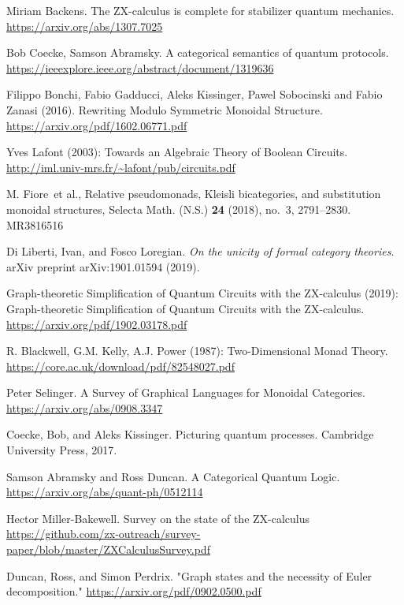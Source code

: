 \documentclass{amsart}
\begin{document}
\begin{thebibliography}{99}

 Miriam Backens. The ZX-calculus is complete for stabilizer quantum mechanics. \url{https://arxiv.org/abs/1307.7025}

 Bob Coecke, Samson Abramsky. A categorical
  semantics of quantum protocols. \url{https://ieeexplore.ieee.org/abstract/document/1319636}

 Filippo Bonchi, Fabio Gadducci, Aleks
  Kissinger, Pawel Sobocinski and Fabio Zanasi (2016). Rewriting
  Modulo Symmetric Monoidal Structure.
  \url{https://arxiv.org/pdf/1602.06771.pdf}

 Yves Lafont (2003): Towards an
  Algebraic Theory of Boolean Circuits.
  \url{http://iml.univ-mrs.fr/~lafont/pub/circuits.pdf}

 M. Fiore\ et al., Relative pseudomonads, Kleisli bicategories, and substitution monoidal structures, Selecta Math. (N.S.) {\bf 24} (2018), no.~3, 2791--2830. MR3816516

 Di Liberti, Ivan, and Fosco Loregian. \emph{On the unicity of formal category theories.} arXiv preprint arXiv:1901.01594 (2019).

 Graph-theoretic Simplification of Quantum Circuits with the ZX-calculus (2019):
Graph-theoretic Simplification of Quantum Circuits with the ZX-calculus.
\url{https://arxiv.org/pdf/1902.03178.pdf}

 R. Blackwell, G.M. Kelly, A.J. Power (1987): Two-Dimensional Monad Theory.
  \url{https://core.ac.uk/download/pdf/82548027.pdf}

 Peter Selinger. A Survey of Graphical Languages for
  Monoidal Categories. \url{https://arxiv.org/abs/0908.3347}

 Coecke, Bob, and Aleks Kissinger. Picturing quantum processes. Cambridge University Press, 2017.

 Samson Abramsky and Ross Duncan. A Categorical Quantum Logic. \url{https://arxiv.org/abs/quant-ph/0512114}

 Hector Miller-Bakewell. Survey on the state of the ZX-calculus
 \url{https://github.com/zx-outreach/survey-paper/blob/master/ZXCalculusSurvey.pdf}

 Duncan, Ross, and Simon
  Perdrix. "Graph states and the necessity of Euler decomposition."
  \url{https://arxiv.org/pdf/0902.0500.pdf}


\end{thebibliography}
\end{document}
